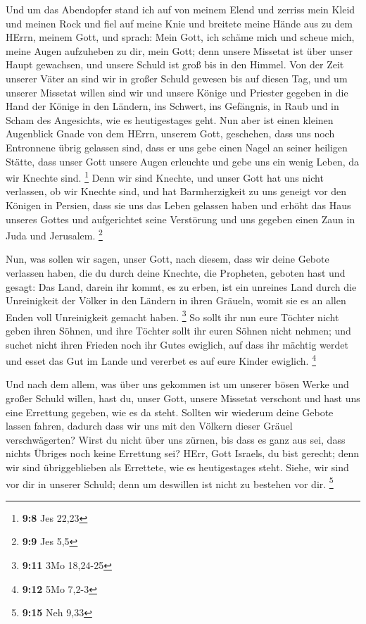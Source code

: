  Und um das Abendopfer stand ich auf von meinem Elend und
zerriss mein Kleid und meinen Rock und fiel auf meine Knie und breitete
meine Hände aus zu dem HErrn, meinem Gott,  und sprach:
Mein Gott, ich schäme mich und scheue mich, meine Augen aufzuheben zu
dir, mein Gott; denn unsere Missetat ist über unser Haupt gewachsen, und
unsere Schuld ist groß bis in den Himmel.  Von der Zeit
unserer Väter an sind wir in großer Schuld gewesen bis auf diesen Tag,
und um unserer Missetat willen sind wir und unsere Könige und Priester
gegeben in die Hand der Könige in den Ländern, ins Schwert, ins
Gefängnis, in Raub und in Scham des Angesichts, wie es heutigestages
geht.  Nun aber ist einen kleinen Augenblick Gnade von dem
HErrn, unserem Gott, geschehen, dass uns noch Entronnene übrig gelassen
sind, dass er uns gebe einen Nagel an seiner heiligen Stätte, dass unser
Gott unsere Augen erleuchte und gebe uns ein wenig Leben, da wir Knechte
sind. \footnote{\textbf{9:8} Jes 22,23}  Denn wir sind
Knechte, und unser Gott hat uns nicht verlassen, ob wir Knechte sind,
und hat Barmherzigkeit zu uns geneigt vor den Königen in Persien, dass
sie uns das Leben gelassen haben und erhöht das Haus unseres Gottes und
aufgerichtet seine Verstörung und uns gegeben einen Zaun in Juda und
Jerusalem. \footnote{\textbf{9:9} Jes 5,5}

 Nun, was sollen wir sagen, unser Gott, nach diesem, dass
wir deine Gebote verlassen haben,  die du durch deine
Knechte, die Propheten, geboten hast und gesagt: Das Land, darein ihr
kommt, es zu erben, ist ein unreines Land durch die Unreinigkeit der
Völker in den Ländern in ihren Gräueln, womit sie es an allen Enden voll
Unreinigkeit gemacht haben. \footnote{\textbf{9:11} 3Mo 18,24-25}
 So sollt ihr nun eure Töchter nicht geben ihren Söhnen,
und ihre Töchter sollt ihr euren Söhnen nicht nehmen; und suchet nicht
ihren Frieden noch ihr Gutes ewiglich, auf dass ihr mächtig werdet und
esset das Gut im Lande und vererbet es auf eure Kinder ewiglich.
\footnote{\textbf{9:12} 5Mo 7,2-3}

 Und nach dem allem, was über uns gekommen ist um unserer
bösen Werke und großer Schuld willen, hast du, unser Gott, unsere
Missetat verschont und hast uns eine Errettung gegeben, wie es da steht.
 Sollten wir wiederum deine Gebote lassen fahren, dadurch
dass wir uns mit den Völkern dieser Gräuel verschwägerten? Wirst du
nicht über uns zürnen, bis dass es ganz aus sei, dass nichts Übriges
noch keine Errettung sei?  HErr, Gott Israels, du bist
gerecht; denn wir sind übriggeblieben als Errettete, wie es
heutigestages steht. Siehe, wir sind vor dir in unserer Schuld; denn um
deswillen ist nicht zu bestehen vor dir. \footnote{\textbf{9:15} Neh
  9,33}

